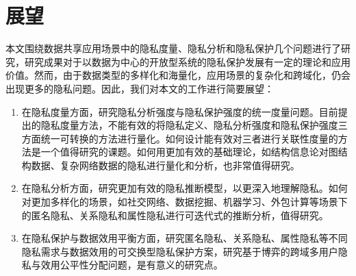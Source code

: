 \section{展望}
   本文围绕数据共享应用场景中的隐私度量、隐私分析和隐私保护几个问题进行了研究，研究成果对于以数据为中心的开放型系统的隐私保护发展有一定的理论和应用价值。然而，由于数据类型的多样化和海量化，应用场景的复杂化和跨域化，仍会出现更多的隐私问题。因此，我们对本文的工作进行简要展望：
\begin{enumerate}
	\item 在隐私度量方面，研究隐私分析强度与隐私保护强度的统一度量问题。目前提出的隐私度量方法，不能有效的将隐私定义、隐私分析强度和隐私保护强度三方面统一可转换的方法进行量化。如何设计能有效对三者进行关联性度量的方法是一个值得研究的课题。如何用更加有效的基础理论，如结构信息论对图结构数据、复杂网络数据的隐私进行量化和分析，也非常值得研究。
	
	\item 在隐私分析方面，研究更加有效的隐私推断模型，以更深入地理解隐私。如何对更加多样化的场景，如社交网络、数据挖掘、机器学习、外包计算等场景下的匿名隐私、关系隐私和属性隐私进行可迭代式的推断分析，值得研究。
	
	\item 在隐私保护与数据效用平衡方面，研究匿名隐私、关系隐私、属性隐私等不同隐私需求与数据效用的可交换型隐私保护方案，研究基于博弈的跨域多用户隐私与效用公平性分配问题，是有意义的研究点。

\end{enumerate}
